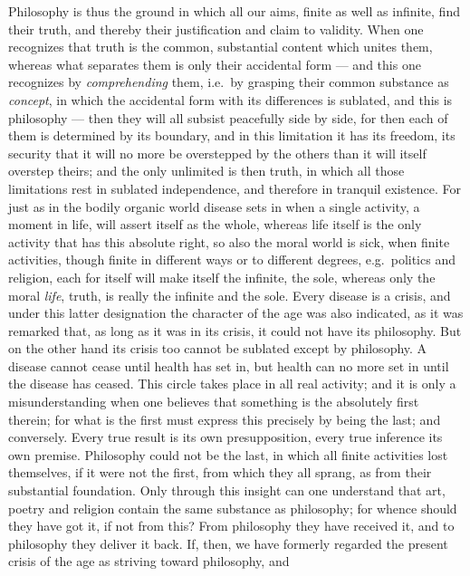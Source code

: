 \documentclass[12pt,a4paper,openany]{book}
\newcommand{\opage}[1]{\marginnote{\footnotesize\textit{[#1]}}}
\begin{document}
Philosophy is thus the ground in which all our aims, finite as well as infinite, find
their truth, and thereby their justification and claim to validity. When one
recognizes that truth is the common, substantial content which unites them, whereas
what separates them is only their accidental form --- and this one recognizes by
\emph{comprehending} them, i.e.\ by grasping their common substance as \emph{concept},
in which the accidental form with its differences is sublated, and this is philosophy
--- then they will all subsist peacefully side by side, for then each of them is
determined by its boundary, and in this limitation it has its freedom, its security
that it will no more be overstepped by the others than it will itself overstep
theirs; and the only unlimited is then truth, in which all those limitations rest in
sublated independence, and therefore in tranquil existence. For just as in the
bodily organic world disease sets in when a single activity, a moment in life, will
assert itself as the whole, whereas life itself is the only activity that has this
absolute right, so also the moral
\setcounter{footnote}{0}%
\opage{154}world is sick, when finite activities, though finite in different ways or to
different degrees, e.g.\ politics and religion, each for itself will make itself the
infinite, the sole, whereas only the moral \emph{life}, truth, is really the infinite
and the sole. Every disease is a crisis, and under this latter designation the
character of the age was also indicated, as it was remarked that, as long as it was in
its crisis, it could not have its philosophy. But on the other hand its crisis too
cannot be sublated except by philosophy. A disease cannot cease until health has set
in, but health can no more set in until the disease has ceased. This circle takes
place in all real activity; and it is only a misunderstanding when one believes that
something is the absolutely first therein; for what is the first must express this
precisely by being the last; and conversely. Every true result is its own
presupposition, every true inference its own premise. Philosophy could not be the
last, in which all finite activities lost themselves, if it were not the first, from
which they all sprang, as from their substantial foundation. Only through this
insight can one understand that art, poetry and religion contain the same substance as
philosophy; for whence should they have got it, if not from this? From philosophy
they have received it, and to philosophy they deliver it back. If, then, we have
formerly regarded the present crisis of the age as striving toward philosophy, and
\end{document}
